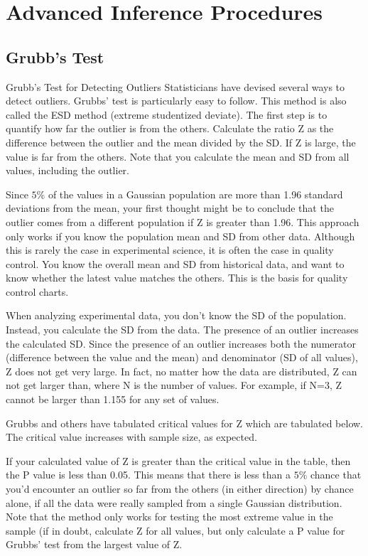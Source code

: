 \chapter{Advanced Inference Procedures}



\section{Grubb's Test}

Grubb's Test for Detecting Outliers
Statisticians have devised several ways to detect outliers. Grubbs' test is particularly easy to follow. This method is also called the ESD method (extreme studentized deviate).
The first step is to quantify how far the outlier is from the others. Calculate the ratio Z as the difference between the outlier and the mean divided by the SD. If Z is large, the value is far from the others. Note that you calculate the mean and SD from all values, including the outlier.



Since $5\%$ of the values in a Gaussian population are more than 1.96 standard deviations from the mean, your first thought might be to conclude that the outlier comes from a different population if Z is greater than 1.96. This approach only works if you know the population mean and SD from other data. Although this is rarely the case in experimental science, it is often the case in quality control. You know the overall mean and SD from historical data, and want to know whether the latest value matches the others. This is the basis for quality control charts.

When analyzing experimental data, you don't know the SD of the population. Instead, you calculate the SD from the data. The presence of an outlier increases the calculated SD. Since the presence of an outlier increases both the numerator (difference between the value and the mean) and denominator (SD of all values), Z does not get very large. In fact, no matter how the data are distributed, Z can not get larger than, where N is the number of values. For example, if N=3, Z cannot be larger than 1.155 for any set of values.

Grubbs and others have tabulated critical values for Z which are tabulated below. The critical value increases with sample size, as expected.

If your calculated value of Z is greater than the critical value in the table, then the P value is less than 0.05. This means that there is less than a $5\%$ chance that you'd encounter an outlier so far from the others (in either direction) by chance alone, if all the data were really sampled from a single Gaussian distribution. Note that the method only works for testing the most extreme value in the sample (if in doubt, calculate Z for all values, but only calculate a P value for Grubbs' test from the largest value of Z.

